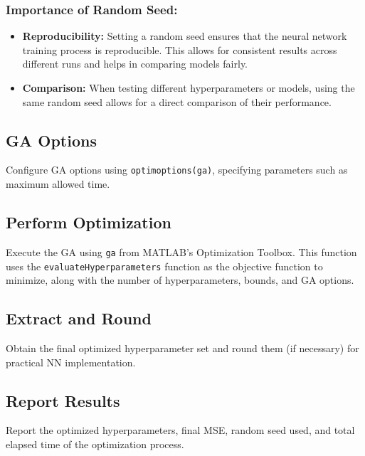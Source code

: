 \documentclass[
  super,
  review,
  3p]{elsarticle}
\providecommand{\tightlist}{%
  \setlength{\itemsep}{0pt}\setlength{\parskip}{0pt}}\usepackage{longtable,booktabs,array}
\begin{document}
\subsubsection{Importance of Random
Seed:}\label{importance-of-random-seed}

\begin{itemize}
\tightlist
\item
  \textbf{Reproducibility:} Setting a random seed ensures that the
  neural network training process is reproducible. This allows for
  consistent results across different runs and helps in comparing models
  fairly.
\item
  \textbf{Comparison:} When testing different hyperparameters or models,
  using the same random seed allows for a direct comparison of their
  performance.
\end{itemize}

\subsection{GA Options}\label{ga-options}

Configure GA options using
\texttt{optimoptions(\textquotesingle{}ga\textquotesingle{})},
specifying parameters such as maximum allowed time.

\subsection{Perform Optimization}\label{perform-optimization}

Execute the GA using \texttt{ga} from MATLAB's Optimization Toolbox.
This function uses the \texttt{evaluateHyperparameters} function as the
objective function to minimize, along with the number of
hyperparameters, bounds, and GA options.

\subsection{Extract and Round}\label{extract-and-round}

Obtain the final optimized hyperparameter set and round them (if
necessary) for practical NN implementation.

\subsection{Report Results}\label{report-results}

Report the optimized hyperparameters, final MSE, random seed used, and
total elapsed time of the optimization process.
\end{document}
